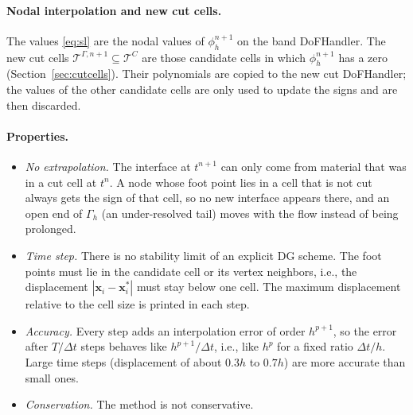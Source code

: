 \documentclass[11pt,a4paper]{article}
\newcommand{\T}{\mathcal{T}}
\newcommand{\x}{\bm{x}}
\begin{document}
\paragraph{Nodal interpolation and new cut cells.}
The values \eqref{eq:sl} are the nodal values of $\phi_h^{n+1}$ on the band DoFHandler. The new cut
cells $\T^{\Gamma,n+1} \subseteq \T^{C}$ are those candidate cells in which $\phi_h^{n+1}$ has a zero
(Section~\ref{sec:cutcells}). Their polynomials are copied to the new cut DoFHandler; the values of
the other candidate cells are only used to update the signs and are then discarded.

\paragraph{Properties.}
\begin{itemize}
  \item \emph{No extrapolation.} The interface at $t^{n+1}$ can only come from material that was in
  a cut cell at $t^{n}$. A node whose foot point lies in a cell that is not cut always gets the sign
  of that cell, so no new interface appears there, and an open end of $\Gamma_h$ (an under-resolved
  tail) moves with the flow instead of being prolonged.
  \item \emph{Time step.} There is no stability limit of an explicit DG scheme. The foot points must
  lie in the candidate cell or its vertex neighbors, i.e., the displacement $|\x_i - \x_i^*|$ must
  stay below one cell. The maximum displacement relative to the cell size is printed in each step.
  \item \emph{Accuracy.} Every step adds an interpolation error of order $h^{p+1}$, so the error
  after $T/\Delta t$ steps behaves like $h^{p+1}/\Delta t$, i.e., like $h^{p}$ for a fixed ratio
  $\Delta t / h$. Large time steps (displacement of about $0.3h$ to $0.7h$) are more accurate than
  small ones.
  \item \emph{Conservation.} The method is not conservative.
\end{itemize}
\end{document}
